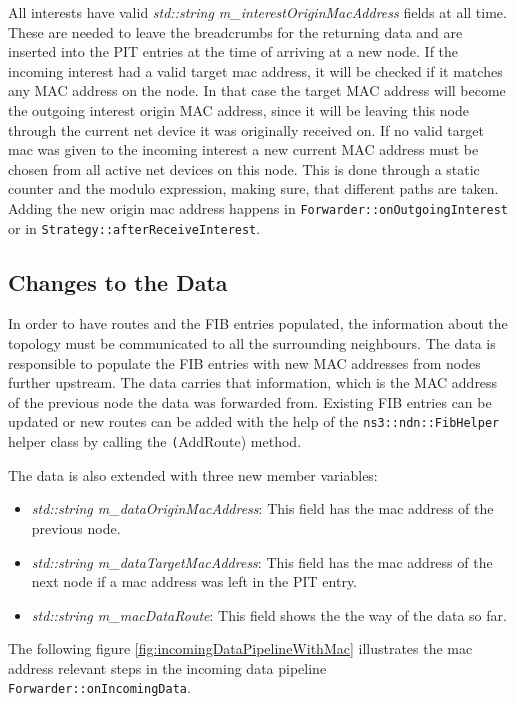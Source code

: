 All interests have valid \emph{std::string m\_interestOriginMacAddress} fields at all time. These are needed to leave the breadcrumbs for the returning data and are inserted into the PIT entries at the time of arriving at a new node. If the incoming interest had a valid target mac address, it will be checked if it matches any MAC address on the node. In that case the target MAC address will become the outgoing interest origin MAC address, since it will be leaving this node through the current net device it was originally received on. If no valid target mac was given to the incoming interest a new current MAC address must be chosen from all active net devices on this node. This is done through a static counter and the modulo expression, making sure, that different paths are taken. Adding the new origin mac address happens in \texttt{Forwarder::onOutgoingInterest} or in \texttt{Strategy::afterReceiveInterest}.

\subsection{Changes to the Data}

In order to have routes and the FIB entries populated, the information about the topology must be communicated to all the surrounding neighbours. The data is responsible to populate the FIB entries with new MAC addresses from nodes further upstream. The data carries that information, which is the MAC address of the previous node the data was forwarded from. Existing FIB entries can be updated or new routes can be added with the help of the \texttt{ns3::ndn::FibHelper} helper class by calling the \texttt(AddRoute) method.

The data is also extended with three new member variables:

\begin{itemize}
\item \emph{std::string m\_dataOriginMacAddress}: This field has the mac address of the previous node.
\item \emph{std::string m\_dataTargetMacAddress}: This field has the mac address of the next node if a mac address was left in the PIT entry.
\item \emph{std::string m\_macDataRoute}: This field shows the the way of the data so far.
\end{itemize}

The following figure \ref{fig:incomingDataPipelineWithMac} illustrates the mac address relevant steps in the incoming data pipeline \texttt{Forwarder::onIncomingData}.

